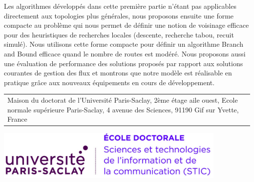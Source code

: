 \documentclass[12pt,a4paper]{book}
\begin{document}
\begin{mdframed}[linecolor=Prune,linewidth=1]
\begin{small}
\begin{multicols}{2}
Les algorithmes développés dans cette première partie n’étant pas applicables directement aux topologies plus générales, nous proposons ensuite une forme compacte au problème qui nous permet de définir une notion de voisinage efficace pour des heuristiques de recherches locales (descente, recherche tabou, recuit simulé). Nous utilisons cette forme compacte pour définir un algorithme Branch and Bound efficace quand le nombre de routes est modéré.
Nous proposons aussi une évaluation de performance des solutions proposés par rapport aux solutions courantes de gestion des flux et montrons que notre modèle est réalisable en pratique grâce aux nouveaux équipements en cours de développement.
\end{multicols}
\end{small}
\end{mdframed}

\vspace{8cm} %
\selectfont
\begin{tabular}{p{14cm}r}
\multirow{3}{16cm}[+0mm]{{\color{Prune} Maison du doctorat de l'Université Paris-Saclay, 2ème étage aile ouest, Ecole normale supérieure Paris-Saclay, 4 avenue des Sciences, 91190 Gif sur Yvette, France}} & \\
\end{tabular}
\newpage
{}\selectfont
\noindent 

\includegraphics[height=2.45cm]{logostic}
\end{document}
